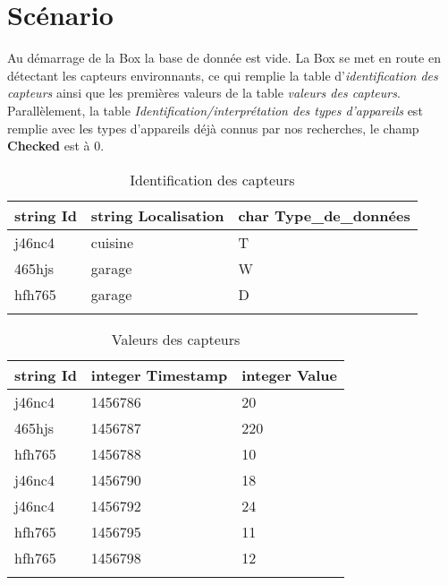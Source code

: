 \documentclass[10pt,a4paper]{article}
\begin{document}
\section{Scénario}
Au démarrage de la Box la base de donnée est vide. La Box se met en route en détectant les capteurs environnants, ce qui remplie la table d'\textit{identification des capteurs} ainsi que les premières valeurs de la table\textit{ valeurs des capteurs}. Parallèlement, la table \textit{Identification/interprétation des types d'appareils} est remplie avec les types d'appareils déjà connus par nos recherches, le champ \textbf{Checked} est à 0. \\
\begin{table}[h!]
    \centering
    \begin{tabular}{|l|l|l|}
    \hline
    \rowcolor[HTML]{EFEFEF} 
    string Id & string Localisation & char Type\_de\_données \\ \hline
    j46nc4    & cuisine             & T                      \\ \hline
    465hjs    & garage              & W                      \\ \hline
    hfh765    & garage              & D                      \\ \hline
              &                     &                       
    \end{tabular}
    \caption{Identification des capteurs}
\end{table}

\begin{table}[h!]
\centering
    \begin{tabular}{|l|l|l|}
    \hline
    \rowcolor[HTML]{EFEFEF} 
    string Id & integer Timestamp & integer Value \\ \hline
    j46nc4    & 1456786           & 20            \\ \hline
    465hjs    & 1456787           & 220           \\ \hline
    hfh765    & 1456788           & 10            \\ \hline
    j46nc4    & 1456790           & 18            \\ \hline
    j46nc4    & 1456792           & 24            \\ \hline
    hfh765    & 1456795           & 11            \\ \hline
    hfh765    & 1456798           & 12            \\ \hline
              &                   &              
    \end{tabular}
    \caption{Valeurs des capteurs}
\end{table}
\end{document}
